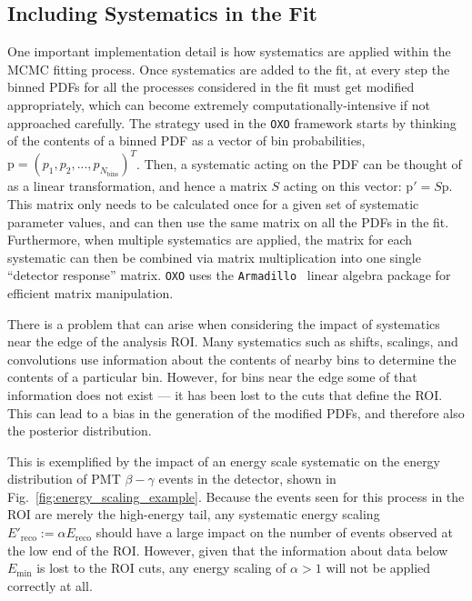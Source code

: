 \subsection{Including Systematics in the Fit}\label{sec:sys_in_fit_theory}
One important implementation detail is how systematics are applied within the MCMC fitting process. Once systematics are added to the fit, at every step the binned PDFs for all the processes considered in the fit must get modified appropriately, which can become extremely computationally-intensive if not approached carefully. The strategy used in the \texttt{OXO} framework starts by thinking of the contents of a binned PDF as a vector of bin probabilities, $\bm{\mathrm{p}} = \left(p_{1}, p_{2}, ..., p_{N_{\textrm{bins}}}\right)^{T}$. Then, a systematic acting on the PDF can be thought of as a linear transformation, and hence a matrix $S$ acting on this vector: $\bm{\mathrm{p}'} = S\bm{\mathrm{p}}$. This matrix only needs to be calculated once for a given set of systematic parameter values, and can then use the same matrix on all the PDFs in the fit. Furthermore, when multiple systematics are applied, the matrix for each systematic can then be combined via matrix multiplication into one single ``detector response'' matrix. \texttt{OXO} uses the \texttt{Armadillo}~\cite{sandersonArmadilloTemplatebasedLibrary2016,sandersonUserFriendlyHybridSparse2018} %
linear algebra package for efficient matrix manipulation.

There is a problem that can arise when considering the impact of systematics near the edge of the analysis ROI. Many systematics such as shifts, scalings, and convolutions use information about the contents of nearby bins to determine the contents of a particular bin. However, for bins near the edge some of that information does not exist --- it has been lost to the cuts that define the ROI. This can lead to a bias in the generation of the modified PDFs, and therefore also the posterior distribution.

This is exemplified by the impact of an energy scale systematic on the energy distribution of PMT $\beta-\gamma$ events in the detector, shown in Fig.~\ref{fig:energy_scaling_example}. Because the events seen for this process in the ROI are merely the high-energy tail, any systematic energy scaling $E'_{\textrm{reco}} := \alpha E_{\textrm{reco}}$ should have a large impact on the number of events observed at the low end of the ROI. However, given that the information about data below $E_{\textrm{min}}$ is lost to the ROI cuts, any energy scaling of $\alpha>1$ will not be applied correctly at all.

